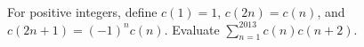 For positive integers, define $c(1)=1$, $c(2n)=c(n)$, and $c(2n+1)=(-1)^nc(n)$. Evaluate $\sum_{n=1}^{2013}c(n)c(n+2)$.
